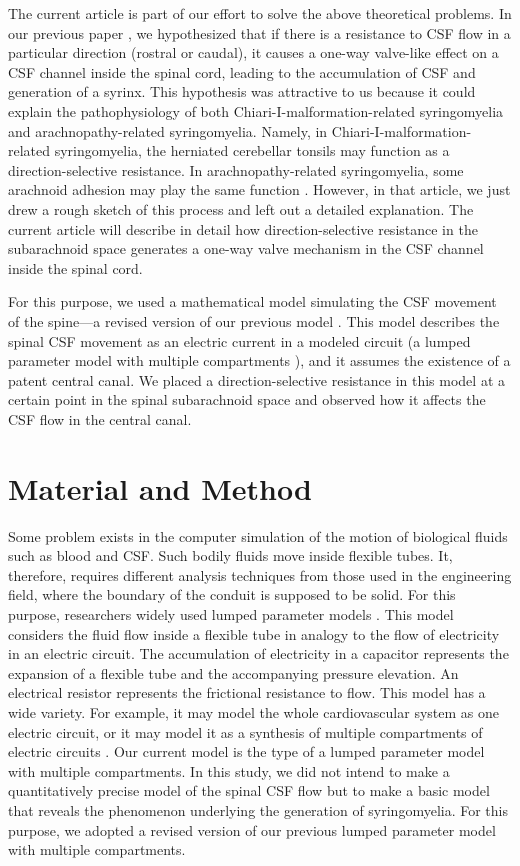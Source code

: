 \documentclass[fleqn,10pt]{wlscirep}
\begin{document}
The current article is part of our effort to solve the above theoretical
problems. In our previous paper \cite{chang2021hypothesis}, we hypothesized
that if there is a resistance to CSF flow in a particular direction
(rostral or caudal), it causes a one-way valve-like effect on a CSF channel
inside the spinal cord, leading to the accumulation of CSF and generation
of a syrinx. This hypothesis was attractive to us because it could explain
the pathophysiology of both Chiari-I-malformation-related syringomyelia and
arachnopathy-related syringomyelia. Namely, in
Chiari-I-malformation-related syringomyelia, the herniated cerebellar
tonsils may function as a direction-selective resistance. In
arachnopathy-related syringomyelia, some arachnoid adhesion may play the
same function \cite{chang2014dorsal}.  However, in that article, we just
drew a rough sketch of this process and left out a detailed explanation.
The current article will describe in detail how direction-selective
resistance in the subarachnoid space generates a one-way valve mechanism in
the CSF channel inside the spinal cord.

For this purpose, we used a mathematical model simulating the CSF movement
of the spine---a revised version of our previous model \cite{chang2003hypothesis,
chang2004theoretical}. This model describes the spinal CSF movement as an
electric current in a modeled circuit (a lumped parameter model with
multiple compartments \cite{shi2011review}), and it assumes the existence of a
patent central canal. We placed a direction-selective resistance in this
model at a certain point in the spinal subarachnoid space and observed how
it affects the CSF flow in the central canal.

\section*{Material and Method}

Some problem exists in the computer simulation of the motion of biological
fluids such as blood and CSF. Such bodily fluids move inside flexible
tubes. It, therefore, requires different analysis techniques from those
used in the engineering field, where the boundary of the conduit is
supposed to be solid. For this purpose, researchers widely used lumped
parameter models \cite{shi2011review, kokalari2013review}. This model
considers the fluid flow inside a flexible tube in analogy to the flow of
electricity in an electric circuit. The accumulation of electricity in a
capacitor represents the expansion of a flexible tube and the accompanying
pressure elevation. An electrical resistor represents the frictional
resistance to flow. This model has a wide variety. For example, it may
model the whole cardiovascular system as one electric circuit, or it may
model it as a synthesis of multiple compartments of electric circuits
\cite{shi2011review, kokalari2013review}. Our current model is the type of a
lumped parameter model with multiple compartments.  In this study, we did
not intend to make a quantitatively precise model of the spinal CSF flow
but to make a basic model that reveals the phenomenon underlying the
generation of syringomyelia. For this purpose, we adopted a revised version
of our previous lumped parameter model with multiple compartments.
\end{document}
